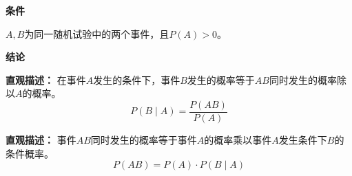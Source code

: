 \begin{statementbox}
	\textbf{\textcolor{CStatement}{条件}}
	\begin{description}[style=nextline, leftmargin=2.8em, labelsep=0.5em, itemsep=0.35em]
		\item[\textbf{\textcolor{CStatement}{条件1（事件与概率）：}}] $A,B$为同一随机试验中的两个事件，且$P(A)>0$。
	\end{description}
	\textbf{\textcolor{CStatement}{结论}}
	\begin{description}[style=nextline, leftmargin=2.8em, labelsep=0.5em, itemsep=0.45em]
		\item[\textbf{\textcolor{CStatement}{结论一（条件概率）：}}]
			\textbf{\textcolor{CStatement}{直观描述：}}
			在事件$A$发生的条件下，事件$B$发生的概率等于$AB$同时发生的概率除以$A$的概率。
			\[
				P(B \mid A) = \frac{P(AB)}{P(A)}
			\]
		\item[\textbf{\textcolor{CStatement}{推广结论（乘法公式）：}}]
			\textbf{\textcolor{CStatement}{直观描述：}}
			事件$AB$同时发生的概率等于事件$A$的概率乘以事件$A$发生条件下$B$的条件概率。
			\[
				P(AB) = P(A) \cdot P(B \mid A)
			\]
	\end{description}
\end{statementbox}
